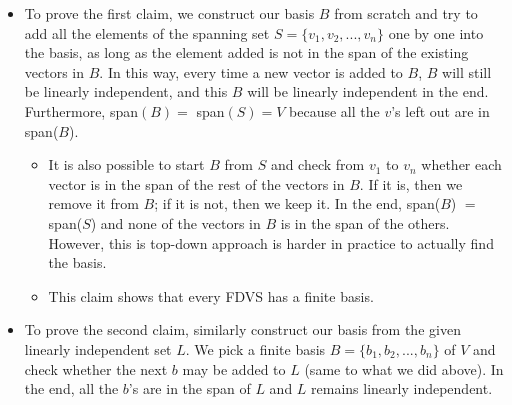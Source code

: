 \documentclass{article}
\begin{document}
\begin{itemize}
    \begin{itemize}
        \item To prove the first claim, we construct our basis $B$ from scratch and try to add all the elements of the spanning set $S = \{v_1, v_2, ..., v_n\}$ one by one into the basis, as long as the element added is not in the span of the existing vectors in $B$. In this way, every time a new vector is added to $B$, $B$ will still be linearly independent, and this $B$ will be linearly independent in the end. Furthermore, span$(B) = $ span$(S) = V$ because all the $v$'s left out are in span($B$).
        \begin{itemize}
            \item It is also possible to start $B$ from $S$ and check from $v_1$ to $v_n$ whether each vector is in the span of the rest of the vectors in $B$. If it is, then we remove it from $B$; if it is not, then we keep it. In the end, span($B$) $=$ span($S$) and none of the vectors in $B$ is in the span of the others. However, this is top-down approach is harder in practice to actually find the basis.
            \item This claim shows that every FDVS has a finite basis.
        \end{itemize}
        \item To prove the second claim, similarly construct our basis from the given linearly independent set $L$. We pick a finite basis $B = \{b_1, b_2,...,b_n\}$ of $V$ and check whether the next $b$ may be added to $L$ (same to what we did above). In the end, all the $b$'s are in the span of $L$ and $L$ remains linearly independent.
    \end{itemize}
    

\end{itemize}
\end{document}
